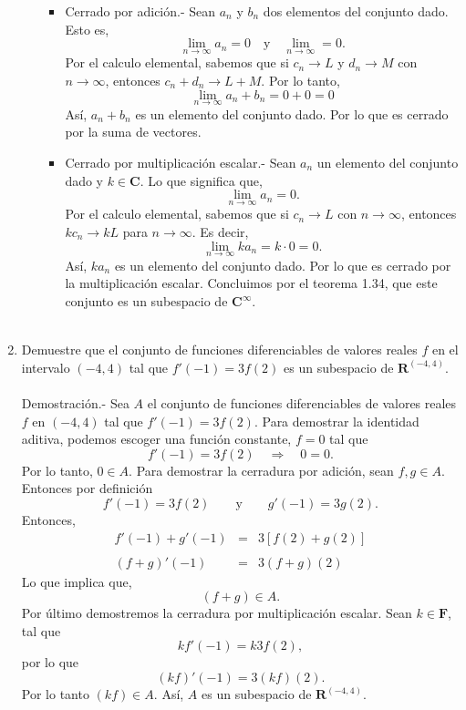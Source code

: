 \begin{enumerate}[\bfseries 1.]
\begin{enumerate}[(a)]
\begin{itemize}
		    \item Cerrado por adición.-\; Sean $a_n$ y $b_n$ dos elementos del conjunto dado. Esto es,
			$$\lim_{n\to \infty}a_n=0\quad \mbox{y}\quad \lim_{n\to \infty}=0.$$
		    Por el calculo elemental, sabemos que si $c_n\to L$ y $d_n\to M$ con $n\to \infty$, entonces $c_n+d_n\to L+M$. Por lo tanto,
		    $$\lim_{n\to \infty}a_n+b_n=0+0=0$$
		    Así, $a_n+b_n$ es un elemento del conjunto dado. Por lo que es cerrado por la suma de vectores.

		    \item Cerrado por multiplicación escalar.-\; Sean $a_n$ un elemento del conjunto dado y $k\in \textbf{C}$. Lo que significa que,
			$$\lim_{n\to \infty}a_n=0.$$
			Por el calculo elemental, sabemos que si $c_n\to L$ con $n\to \infty$, entonces $kc_n\to kL$ para $n\to \infty$. Es decir,
			$$\lim_{n\to \infty}ka_n = k\cdot 0 = 0.$$
			Así, $ka_n$ es un elemento del conjunto dado. Por lo que es cerrado por la multiplicación escalar. Concluimos por el teorema 1.34, que este conjunto es un subespacio de $\textbf{C}^{\infty}$.\\\\
		\end{itemize}

	\end{enumerate}

    \item Demuestre que el conjunto de funciones diferenciables de valores reales $f$ en el intervalo $(-4,4)$ tal que $f'(-1)=3f(2)$ es un subespacio de $\textbf{R}^{(-4,4)}$.\\\\
	Demostración.-\; Sea $A$ el conjunto de funciones diferenciables de valores reales $f$ en $(-4,4)$ tal que $f'(-1)=3f(2)$. Para demostrar la identidad aditiva, podemos escoger una función constante, $f=0$ tal que 
	$$f'(-1)=3f(2)\quad \Rightarrow \quad 0=0.$$
	Por lo tanto, $0\in A$. Para demostrar la cerradura por adición, sean $f,g\in A$. Entonces por definición 
	$$f'(-1)=3f(2)\qquad \mbox{y}\qquad g'(-1)=3g(2).$$
	Entonces, 
	$$\begin{array}{rcl}
	    f'(-1)+g'(-1) &=& 3\left[f(2)+g(2)\right]\\\\
	    (f+g)'(-1) &=& 3(f+g)(2)
	\end{array}$$
	Lo que implica que,
	$$(f+g)\in A.$$
	Por último demostremos la cerradura por multiplicación escalar. Sean  $k\in \textbf{F}$, tal que 
	$$kf'(-1)=k3f(2),$$
	por lo que 
	$$(kf)'(-1)=3(kf)(2).$$
	Por lo tanto $(kf)\in A$. Así, $A$ es un subespacio de $\textbf{R}^{(-4,4)}$.\\\\


\end{enumerate}
